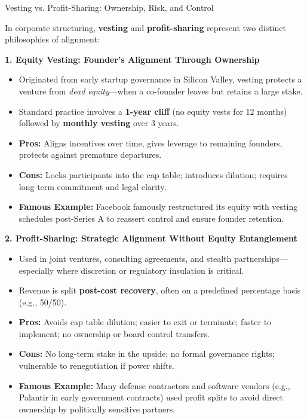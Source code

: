 \begin{HistoricalSidebar}{Vesting vs. Profit-Sharing: Ownership, Risk, and Control}

    In corporate structuring, \textbf{vesting} and \textbf{profit-sharing} represent two distinct philosophies of alignment:
    
    \medskip
    
    \textbf{1. Equity Vesting: Founder's Alignment Through Ownership}

    \medskip
    
    \begin{itemize}
      \item Originated from early startup governance in Silicon Valley, vesting protects a venture from \emph{dead equity}—when a co-founder leaves but retains a large stake.
      \item Standard practice involves a \textbf{1-year cliff} (no equity vests for 12 months) followed by \textbf{monthly vesting} over 3 years.
      \item \textbf{Pros:} Aligns incentives over time, gives leverage to remaining founders, protects against premature departures.
      \item \textbf{Cons:} Locks participants into the cap table; introduces dilution; requires long-term commitment and legal clarity.
      \item \textbf{Famous Example:} Facebook famously restructured its equity with vesting schedules post-Series A to reassert control and ensure founder retention.
    \end{itemize}
    
    \medskip
    
    \textbf{2. Profit-Sharing: Strategic Alignment Without Equity Entanglement}

    \medskip
    
    \begin{itemize}
      \item Used in joint ventures, consulting agreements, and stealth partnerships—especially where discretion or regulatory insulation is critical.
      \item Revenue is split \textbf{post-cost recovery}, often on a predefined percentage basis (e.g., 50/50).
      \item \textbf{Pros:} Avoids cap table dilution; easier to exit or terminate; faster to implement; no ownership or board control transfers.
      \item \textbf{Cons:} No long-term stake in the upside; no formal governance rights; vulnerable to renegotiation if power shifts.
      \item \textbf{Famous Example:} Many defense contractors and software vendors (e.g., Palantir in early government contracts) used profit splits to avoid direct ownership by politically sensitive partners.
    \end{itemize}
    

\end{HistoricalSidebar}
